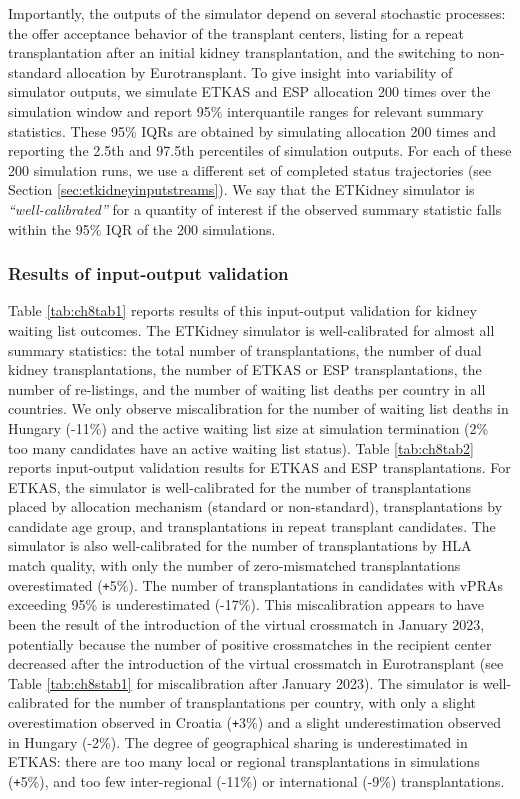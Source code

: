 \documentclass[11pt,twoside,]{book}
\def\Plus{\texttt{+}}
\begin{document}
Importantly, the outputs of the simulator depend on several stochastic
processes: the offer acceptance behavior of the transplant centers,
listing for a repeat transplantation after an initial kidney transplantation,
and the switching to non-standard allocation by Eurotransplant. To give insight into variability of simulator
outputs, we simulate ETKAS and ESP allocation 200 times over the
simulation window and report 95\% interquantile ranges for relevant
summary statistics. These 95\% IQRs are obtained by simulating allocation
200 times and reporting the 2.5th and 97.5th percentiles of simulation
outputs. For each of these 200 simulation runs, we use a different set
of completed status trajectories (see Section \ref{sec:etkidneyinputstreams}). We say that the ETKidney
simulator is \emph{``well-calibrated''} for a quantity of interest if the
observed summary statistic falls within the 95\% IQR of the 200
simulations.

\subsubsection*{Results of input-output validation}\label{sec:etkidneyioval}

Table \ref{tab:ch8tab1} reports results of this input-output validation for kidney waiting list outcomes.
The ETKidney simulator
is well-calibrated for almost all summary statistics: the total number
of transplantations, the number of dual kidney transplantations, the
number of ETKAS or ESP transplantations, the number of re-listings, and
the number of waiting list deaths per country in all countries. We only
observe miscalibration for the number of waiting list deaths in Hungary
(-11\%) and the active waiting list size at simulation termination (2\%
too many candidates have an active waiting list status).
\newpage
Table \ref{tab:ch8tab2} reports input-output validation
results for ETKAS and ESP transplantations. For ETKAS, the simulator is
well-calibrated for the number of transplantations placed by allocation mechanism
(standard or non-standard), transplantations by candidate age group, and
transplantations in repeat transplant candidates. The simulator is
also well-calibrated for the number of transplantations by HLA match
quality, with only the number of zero-mismatched transplantations
overestimated (\Plus 5\%). The number of
transplantations in candidates with vPRAs exceeding 95\% is
underestimated (-17\%). This miscalibration appears to have been the result
of the introduction of the virtual crossmatch in January 2023, potentially
because the number of positive crossmatches in the recipient center decreased
after the introduction of the
virtual crossmatch in Eurotransplant \citep{Heidt2024} (see Table \ref{tab:ch8stab1} for miscalibration after January 2023). The simulator is well-calibrated
for the number of transplantations per country, with only a slight
overestimation observed in Croatia (\Plus 3\%) and a slight
underestimation observed in Hungary (-2\%). The degree of geographical sharing
is underestimated in ETKAS: there are too many local or regional transplantations
in simulations (\Plus 5\%), and too few inter-regional (-11\%) or international
(-9\%) transplantations.
\end{document}
